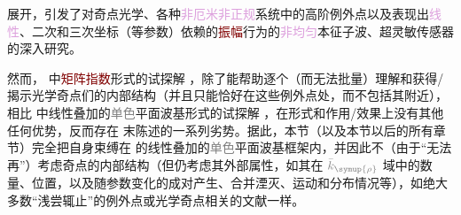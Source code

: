 展开\cite{xieAnalytic3DVector}，引发了对奇点光学\cite{berryOpticalSingularitiesBirefringent2003,berryOpticalSingularitiesBianisotropic2005,kirillovUnfoldingEigenvalueSurfaces2005}、各种\textcolor{Plum}{非厄米}\cite{yangNonabelianPhysicsLight2024}\textcolor{Plum}{非正规}\cite{wiersigDistanceExceptionalPoints2022}系统中的高阶\textcolor{PineGreen}{例外点}\cite{mackayExceptionalGuidedWaves2021,wiersigMovingExceptionalSurface2023}以及表现出\textcolor{Plum}{线性}、二次和三次坐标（等参数）依赖的\textcolor{Maroon}{振幅}行为的\textcolor{Plum}{非均匀}本征子波\cite{lakhtakiaElectromagneticSurfaceWaves2020,gerardinConditionsVoigtWave2001,borzdovWavesLinearQuadratic1996,sturmElectromagneticWavesCrystals2024}、超灵敏传感器\cite{wiersigReviewExceptionalPointbased2020,wiersigMovingExceptionalSurface2023}的深入研究。

然而， 中\textcolor{Maroon}{矩阵指数}形式的试探解 ，除了能帮助逐个（而无法批量）理解和获得/揭示\textcolor{PineGreen}{光学奇点}们的内部结构（并且只能恰好在这些\textcolor{PineGreen}{例外点}处，而不包括其附近），相比  中\textcolor{PineGreen}{线性叠加的\textcolor{gray}{单色}平面波基}形式的试探解 ，在形式和作用/效果上没有其他任何优势，反而存在  末陈述的一系列劣势。据此，本节（以及本节以后的所有章节）完全把自身束缚在  的\textcolor{PineGreen}{线性叠加的\textcolor{gray}{单色}平面波基}框架内，并因此不（由于“无法再”）考虑奇点的内部结构（但仍考虑其外部属性，如其在 $\mathcolor{gray}{\bar{k}_{\symup{\rho}}}$ 域中的数量、位置，以及随参数变化的成对产生、合并湮灭、运动和分布情况等），如绝大多数“浅尝辄止”的\textcolor{PineGreen}{例外点}\cite{hernandezExceptionalPointsNonHermitian2011,hanExceptionalEntanglementPhenomena2023,baiObservationNonlinearExceptional2024,baiNonlinearExceptionalPoints2023}或\textcolor{PineGreen}{光学奇点}\cite{richterExceptionalPointsAnisotropic2017,grundmannSingularOpticalAxes2016,berryOpticalSingularitiesBirefringent2003,berryOpticalSingularitiesBianisotropic2005,grundmannOpticallyAnisotropicMedia2017}相关的文献一样。

